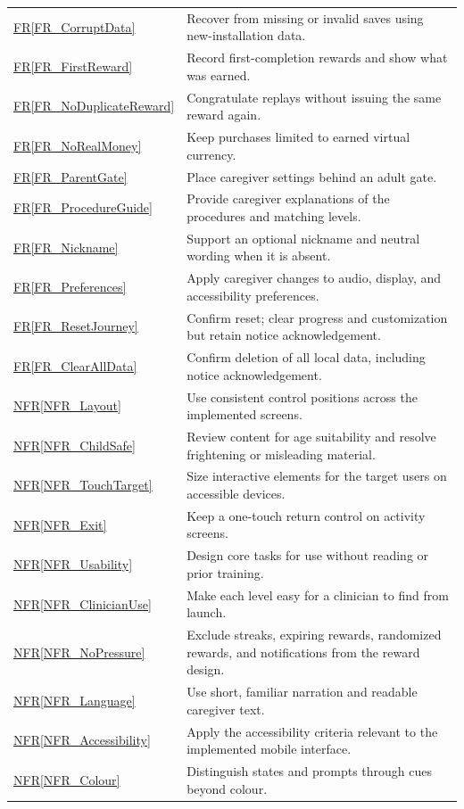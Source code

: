 \documentclass[10pt]{article}
\newcommand{\rref}[1]{\hyperref[#1]{FR\ref*{#1}}}
\newcommand{\nfrref}[1]{\hyperref[#1]{NFR\ref*{#1}}}
\begin{document}
\begin{longtable}{@{}>{\raggedright\arraybackslash}p{}
>{\raggedright\arraybackslash}p{}@{}}
\rref{FR_CorruptData} & Recover from missing or invalid saves using new-installation data. \\
\rref{FR_FirstReward} & Record first-completion rewards and show what was earned. \\
\rref{FR_NoDuplicateReward} & Congratulate replays without issuing the same reward again. \\
\rref{FR_NoRealMoney} & Keep purchases limited to earned virtual currency. \\
\rref{FR_ParentGate} & Place caregiver settings behind an adult gate. \\
\rref{FR_ProcedureGuide} & Provide caregiver explanations of the procedures and matching levels. \\
\rref{FR_Nickname} & Support an optional nickname and neutral wording when it is absent. \\
\rref{FR_Preferences} & Apply caregiver changes to audio, display, and accessibility preferences. \\
\rref{FR_ResetJourney} & Confirm reset; clear progress and customization but retain notice acknowledgement. \\
\rref{FR_ClearAllData} & Confirm deletion of all local data, including notice acknowledgement. \\
\nfrref{NFR_Layout} & Use consistent control positions across the implemented screens. \\
\nfrref{NFR_ChildSafe} & Review content for age suitability and resolve frightening or misleading material. \\
\nfrref{NFR_TouchTarget} & Size interactive elements for the target users on accessible devices. \\
\nfrref{NFR_Exit} & Keep a one-touch return control on activity screens. \\
\nfrref{NFR_Usability} & Design core tasks for use without reading or prior training. \\
\nfrref{NFR_ClinicianUse} & Make each level easy for a clinician to find from launch. \\
\nfrref{NFR_NoPressure} & Exclude streaks, expiring rewards, randomized rewards, and notifications from the reward design. \\
\nfrref{NFR_Language} & Use short, familiar narration and readable caregiver text. \\
\nfrref{NFR_Accessibility} & Apply the accessibility criteria relevant to the implemented mobile interface. \\
\nfrref{NFR_Colour} & Distinguish states and prompts through cues beyond colour. \\

\end{longtable}
\end{document}
